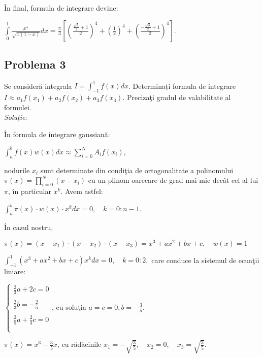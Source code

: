 \documentclass{exam}
\begin{document}
\^{I}n final, formula de integrare devine:

$ \int\limits_0^1\frac{x^4}{\sqrt{x(1-x)}}dx=\frac{\pi}{3}\left[\left(\frac{\frac{\sqrt{3}}{2}+1}{2}\right)^4+\left(\frac{1}{2}\right)^4+\left(\frac{-\frac{\sqrt{3}}{2}+1}{2}\right)^4\right]. $


\subsection{Problema 3}
Se consideră integrala $ \displaystyle I = \int_{-1}^1 f\left(x\right) dx$. Determinați formula de integrare $ I \approx a_1 f\left(x_1\right) + a_2 f\left(x_2\right) + a_3 f\left(x_3\right)$.
Preciza\c{t}i gradul de valabilitate al formulei. \\

\textit{Solu\c{t}ie}:

\^{I}n formula de integrare gaussian\u{a}:

$ \displaystyle \int_a^b f\left(x\right) w\left(x\right) dx  \approx \sum_{i = 0}^N A_{i} f\left(x_{i}\right), $

\noindent nodurile $x_{i}$ sunt determinate din condi\c{t}ia de ortogonalitate a polinomului
$ \pi(x)=\prod_{i=0}^{N}(x-x_i) $
\noindent cu un plinom oarecare de grad mai mic dec\^{a}t cel al lui $\pi$, \^{i}n particular $x^k$. Avem astfel:

$ \int_{a}^{b} \pi(x)\cdot w(x) \cdot x^k dx=0,\quad k=0:n-1. $

\^{I}n cazul nostru,

$ \pi(x)=(x-x_1)\cdot(x-x_2)\cdot(x-x_3)=x^3+ax^2+bx + c, \quad w(x)=1 $

$  \int_{-1}^{1}\left(x^3+ax^2+bx+c\right)x^kdx=0,\quad k=0:2, $
care conduce la sistemul de ecua\c{t}ii liniare:

$
	\left\{
	\begin{array}{ccccccc}
		\frac{2}{3}a    + 2c  = 0           \\ \\
		\frac{2}{3}b   = -\frac{2}{5}       \\ \\
		\frac{2}{5}a +   \frac{2}{3}c  =  0 \\ \\
	\end{array} \right.
$, cu solu\c{t}ia $a=c=0,  b = -\frac{3}{5}.$

$\pi(x)=x^3-\frac{3}{5}x$, cu r\u{a}d\u{a}cinile $x_1=-\sqrt{\frac{3}{5}}, \quad x_2=0, \quad x_3=\sqrt{\frac{3}{5}}$.
\end{document}

